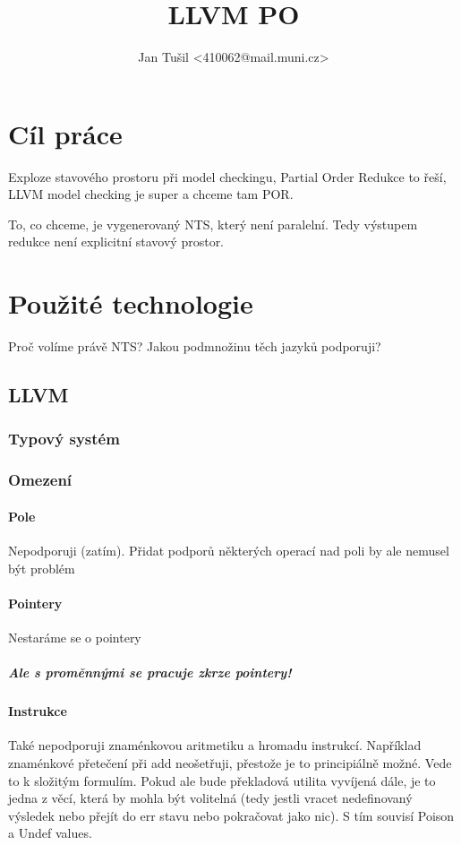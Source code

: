 \documentclass[10pt,a4paper,notitlepage]{report}
\author{Jan Tušil <410062@mail.muni.cz>}
\title{LLVM PO}
\begin{document}
\chapter{Cíl práce}
Exploze stavového prostoru při model checkingu, Partial Order Redukce to řeší,
LLVM model checking je super a chceme tam POR.

To, co chceme, je vygenerovaný NTS, který není paralelní. Tedy výstupem redukce
není explicitní stavový prostor.

\chapter{Použité technologie}
Proč volíme právě NTS? Jakou podmnožinu těch jazyků podporuji?
\section{LLVM}
\subsection{Typový systém}
\label{subsec:llvm-type-system}

\subsection{Omezení}

\subsubsection{Pole}
Nepodporuji (zatím). Přidat podporů některých operací nad poli by ale nemusel být problém
\subsubsection{Pointery}
Nestaráme se o pointery
\paragraph{Ale s proměnnými se pracuje zkrze pointery!}

\subsubsection{Instrukce}
Také nepodporuji znaménkovou aritmetiku a hromadu instrukcí. Například znaménkové přetečení při add neošetřuji, přestože je to principiálně možné. Vede to k složitým formulím. Pokud ale bude překladová utilita vyvíjená dále, je to jedna z věcí, která by mohla být volitelná (tedy jestli vracet nedefinovaný výsledek nebo přejít do err stavu nebo pokračovat jako nic). S tím souvisí Poison a Undef values.
\end{document}
